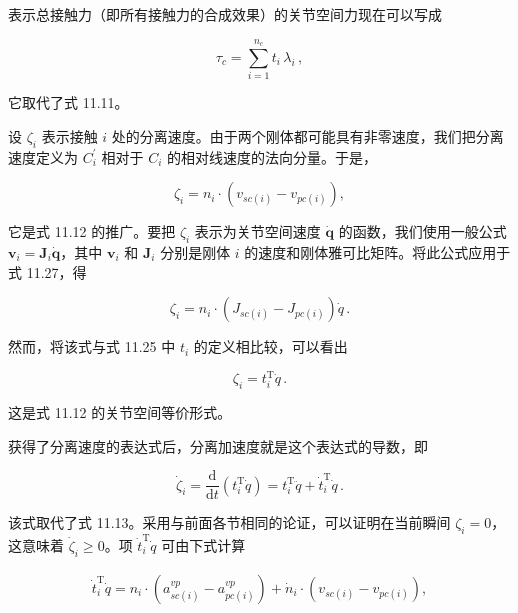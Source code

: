 \documentclass[10pt,a4paper]{book}
\theoremstyle{thmstyle} %
\theoremstyle{defstyle} %
\theoremstyle{prostyle} %
\begin{document}
表示总接触力（即所有接触力的合成效果）的关节空间力现在可以写成



$$
\tau _ { c } = \sum _ { i = 1 } ^{n _ { c} } t _ { i } \, \lambda _ { i } \, ,
$$



它取代了式 11.11。



设 $\zeta_{i}$ 表示接触 $i$ 处的分离速度。由于两个刚体都可能具有非零速度，我们把分离速度定义为 $C_{i}^{\prime}$ 相对于 $C_{i}$ 的相对线速度的法向分量。于是，



$$
\zeta _ { i } = n _ { i } \cdot \left( v _ { s c ( i ) } - v _ { p c ( i ) } \right) ,
$$



它是式 11.12 的推广。要把 $\zeta_{i}$ 表示为关节空间速度 $\dot{\boldsymbol{q}}$ 的函数，我们使用一般公式 $\boldsymbol{v}_{i}=\boldsymbol{J}_{i}\dot{\boldsymbol{q}}$，其中 $\boldsymbol{v}_{i}$ 和 $\boldsymbol{J}_{i}$ 分别是刚体 $i$ 的速度和刚体雅可比矩阵。将此公式应用于式 11.27，得



$$
\zeta _ { i } = n _ { i } \cdot \left( J _ { s c ( i ) } - J _ { p c ( i ) } \right) \dot { q } \, .
$$



然而，将该式与式 11.25 中 $t_{i}$ 的定义相比较，可以看出



$$
\zeta _ { i } = t _ { i } ^{\mathrm { T} } \dot { q } \, .
$$



这是式 11.12 的关节空间等价形式。



获得了分离速度的表达式后，分离加速度就是这个表达式的导数，即



$$
\dot { \zeta } _ { i } = \frac { \mathrm { d } } { \mathrm { d } t } ( t _ { i } ^{\mathrm { T} } \dot { q } ) = t _ { i } ^{\mathrm { T} } \ddot { q } + \dot { t } _ { i } ^{\mathrm { T} } \dot { q } \, .
$$



该式取代了式 11.13。采用与前面各节相同的论证，可以证明在当前瞬间 $\zeta_{i}=0$，这意味着 $\dot{\zeta}_{i}\geq0$。项 $\dot{t}_{i}^{\mathrm{T}}\dot{q}$ 可由下式计算



$$
\begin{array}{r} { \dot { t } _ { i } ^{\mathrm { T} } \dot { q } = n _ { i } \cdot \left( a _ { s c ( i ) } ^{v p} - a _ { p c ( i ) } ^{v p} \right) + \dot { n } _ { i } \cdot \left( v _ { s c ( i ) } - v _ { p c ( i ) } \right) , } \end{array}
$$
\end{document}
